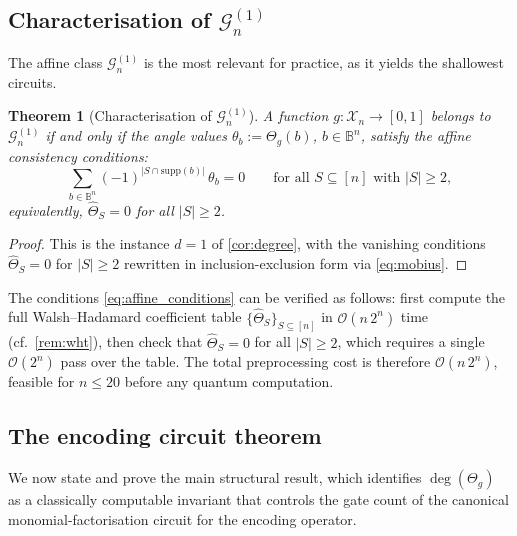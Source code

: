 \documentclass[12pt,a4paper]{article}
\theoremstyle{plain}
\newtheorem{theorem}{Theorem}[section]
\theoremstyle{definition}
\theoremstyle{remark}
\newcommand{\Gclass}[2]{\mathcal{G}_{#1}^{(#2)}}
\newcommand{\Thetag}{\Theta_g}
\newcommand{\wh}[2]{\hat{#1}_{#2}}
\begin{document}
\subsection{Characterisation of \texorpdfstring{$\Gclass{n}{1}$}{G\{n\}\{1\}}}

The affine class $\Gclass{n}{1}$ is the most relevant for practice,
as it yields the shallowest circuits.

\begin{theorem}[Characterisation of $\Gclass{n}{1}$]
\label{thm:affine_char}
A function $g:\mathcal{X}_n\to[0,1]$ belongs to $\Gclass{n}{1}$ if and
only if the angle values $\theta_b:=\Thetag(b)$, $b\in\mathbb{B}^n$,
satisfy the \emph{affine consistency conditions}:
\begin{equation}
  \sum_{b\in\mathbb{B}^n}(-1)^{|S\cap\mathrm{supp}(b)|}\,\theta_b = 0
  \qquad\text{for all }S\subseteq[n]\text{ with }|S|\geq 2,
  \label{eq:affine_conditions}
\end{equation}
equivalently, $\wh{\Theta}{S}=0$ for all $|S|\geq 2$.
\end{theorem}

\begin{proof}
This is the instance $d=1$ of \cref{cor:degree}, with the vanishing
conditions $\wh{\Theta}{S}=0$ for $|S|\geq 2$ rewritten
in inclusion-exclusion form via \eqref{eq:mobius}.
\end{proof}

The conditions \eqref{eq:affine_conditions} can be verified as follows:
first compute the full Walsh--Hadamard coefficient table
$\{\wh{\Theta}{S}\}_{S\subseteq[n]}$ in $\mathcal{O}(n\,2^n)$ time
(cf.\ \cref{rem:wht}), then check that $\wh{\Theta}{S}=0$ for all
$|S|\geq 2$, which requires a single $\mathcal{O}(2^n)$ pass over the
table.
The total preprocessing cost is therefore $\mathcal{O}(n\,2^n)$,
feasible for $n\leq 20$ before any quantum computation.

\subsection{The encoding circuit theorem}

We now state and prove the main structural result, which identifies
$\deg(\Thetag)$ as a classically computable invariant that controls
the gate count of the canonical monomial-factorisation circuit for
the encoding operator.
\end{document}
